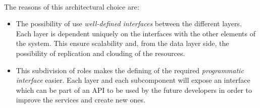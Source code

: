 \paragraph{} The reasons of this architectural choice are:
\begin{itemize}
	\item The possibility of use \textit{well-defined interfaces} between the different layers. Each layer is dependent uniquely on the interfaces with the other elements of the system. This ensure scalability and, from the data layer side, the possibility of replication and clouding of the resources.
	\item This subdivision of roles makes the defining of the required \textit{programmatic interface} easier. Each layer and each subcomponent will expose an interface which can be part of an API to be used by the future developers in order to improve the services and create new ones.
\end{itemize}


